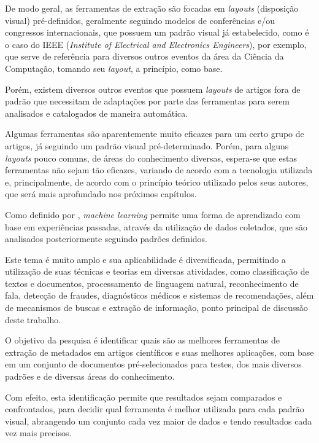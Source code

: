 De modo geral, as ferramentas de extração são focadas em \textit{layouts} (disposição visual) pré-definidos, geralmente seguindo modelos de conferências e/ou congressos internacionais, que possuem um padrão visual já estabelecido, como é o caso do IEEE (\textit{Institute of Electrical and Electronics Engineers}), por exemplo, que serve de referência para diversos outros eventos da área da Ciência da Computação, tomando seu \textit{layout}, a princípio, como base.

Porém, existem diversos outros eventos que possuem \textit{layouts} de artigos fora de padrão que necessitam de adaptações por parte das ferramentas para serem analisados e catalogados de maneira automática. 

Algumas ferramentas são aparentemente muito eficazes para um certo grupo de artigos, já seguindo um padrão visual pré-determinado. Porém, para alguns \textit{layouts} pouco comuns, de áreas do conhecimento diversas, espera-se que estas ferramentas não sejam tão eficazes, variando de acordo com a tecnologia utilizada e, principalmente, de acordo com o princípio teórico utilizado pelos seus autores, que será mais aprofundado nos próximos capítulos.

Como definido por \cite{foundations-machine-learning}, \textit{machine learning} permite uma forma de aprendizado com base em experiências passadas, através da utilização de dados coletados, que são analisados posteriormente seguindo padrões definidos.

Este tema é muito amplo e sua aplicabilidade é diversificada, permitindo a utilização de suas técnicas e teorias em diversas atividades, como classificação de textos e documentos, processamento de linguagem natural, reconhecimento de fala, detecção de fraudes, diagnósticos médicos e sistemas de recomendações, além de mecanismos de buscas e extração de informação, ponto principal de discussão deste trabalho.

O objetivo da pesquisa é identificar quais são as melhores ferramentas de extração de metadados em artigos científicos e suas melhores aplicações, com base em um conjunto de documentos pré-selecionados para testes, dos mais diversos padrões e de diversas áreas do conhecimento.

Com efeito, esta identificação permite que resultados sejam comparados e confrontados, para decidir qual ferramenta é melhor utilizada para cada padrão visual, abrangendo um conjunto cada vez maior de dados e tendo resultados cada vez mais precisos.

